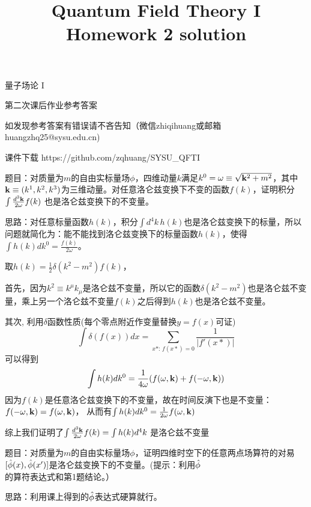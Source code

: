 \documentclass[CJK]{beamer}
\title{Quantum Field Theory I \\ Homework 2 solution}
\author{}
\date{}
\begin{document}
\begin{frame}
 
\begin{center}
\begin{Large}
\bch
量子场论 I 

{\vskip 0.3in}

第二次课后作业参考答案
\skipline
\skipline

如发现参考答案有错误请不吝告知（微信zhiqihuang或邮箱huangzhq25@sysu.edu.cn)
\ech
\end{Large}
\end{center}

\vskip 0.2in

\bch
课件下载
\ech
https://github.com/zqhuang/SYSU\_QFTI

\end{frame}

\begin{frame}
\bch
题目：对质量为$m$的自由实标量场$\phi$，四维动量$k$满足$k^0 = \omega \equiv \sqrt{{\mathbf{k}}^2+m^2}$，其中${\mathbf{k}}\equiv (k^1, k^2, k^3)$为三维动量。对任意洛仑兹变换下不变的函数$f(k)$，证明积分$\int \frac{d^3{\mathbf{k}}}{2\omega} f(k)$ 也是洛仑兹变换下的不变量。

\skipline
思路：对任意标量函数$h(k)$，积分$\int d^4k\, h(k)$也是洛仑兹变换下的标量，所以问题就简化为：能不能找到洛仑兹变换下的标量函数$h(k)$，使得 $\int h(k)d k^0 = \frac{f(k)}{2\omega}$。
\ech
\end{frame}

\begin{frame}
\bch
取$h(k) = \frac{1}{2} \delta(k^2 - m^2) f(k)$，

首先，因为$k^2 \equiv k^\mu k_\mu$是洛仑兹不变量，所以它的函数$\delta(k^2 - m^2)$也是洛仑兹不变量，乘上另一个洛仑兹不变量$f(k)$之后得到$h(k)$也是洛仑兹不变量。

其次, 利用$\delta$函数性质(每个零点附近作变量替换$y=f(x)$可证)
 $$\int \delta\left(f(x)\right) dx= \sum_{x*:\,f(x*) = 0}\frac{1}{|f'(x*)|}$$
可以得到
$$\int h(k) dk^0 = \frac{1}{4\omega}(f(\omega, {\mathbf{k}}) + f(-\omega, {\mathbf{k}}))$$
因为$f(k)$是任意洛仑兹变换下的不变量，故在时间反演下也是不变量：$f(-\omega,{\mathbf{k}}) = f(\omega, {\mathbf{k}})$，
从而有$\int h(k) dk^0 = \frac{1}{2\omega}f(\omega, {\mathbf{k}})$

综上我们证明了$\int \frac{d^3{\mathbf{k}}}{2\omega} f(k) = \int h(k) d^4k$ 是洛仑兹不变量
\ech
\end{frame}



\begin{frame}
\bch
题目：对质量为$m$的自由实标量场$\phi$，证明四维时空下的任意两点场算符的对易$[{\hat{\phi}}(x),{\hat{\phi}}(x')]$是洛仑兹变换下的不变量。(提示：利用${\hat{\phi}}$的算符表达式和第1题结论。）

\skipline
思路：利用课上得到的${\hat{\phi}}$表达式硬算就行。
\ech
\end{frame}
\end{document}
